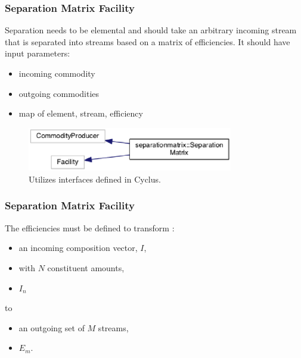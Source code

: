 \begin{frame}[fragile]
  \frametitle{Separation Matrix Facility}
Separation needs to be elemental and should take an arbitrary incoming stream 
that is separated into streams based on a matrix of efficiencies. It should 
have input parameters:

\begin{itemize}
\item incoming commodity
\item outgoing commodities
\item map of element, stream, efficiency
\end{itemize}
\begin{figure}[htbp!]
\begin{center}
\includegraphics[width=0.8\textwidth]{sm_inherit}
\end{center}
\caption{Utilizes interfaces defined in Cyclus.}
\label{fig:sm_inherit}
\end{figure}
\end{frame}
\begin{frame}[fragile]
  \frametitle{Separation Matrix Facility}
The efficiencies must be defined to transform :
\begin{itemize}
 \item an incoming composition vector, $I$, 
 \item with $N$ constituent amounts, 
 \item $I_n$ 
\end{itemize}
to 
\begin{itemize}
\item an outgoing set of $M$ streams,
\item $E_m$.
\end{itemize}

\end{frame}
